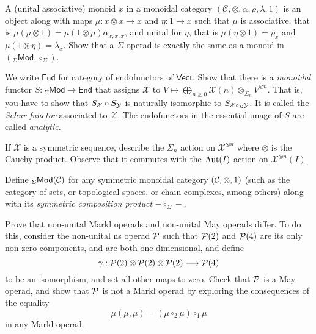 \begin{question}
A (unital associative) monoid $x$ in a monoidal category 
$(\mathcal C,\otimes,\alpha,\rho,\lambda,1)$ is an object
along with maps $\mu: x\otimes x\to x$ and $\eta : 1
 \longrightarrow x$ such that $\mu$ is associative, 
 that is $\mu (\mu\otimes 1) = \mu(1\otimes \mu)
 \alpha_{x,x,x}$, and unital for
$\eta$, that is $\mu(\eta\otimes 1)=\rho_x$
and $\mu(1\otimes \eta) = \lambda_x$.
Show that a $\Sigma$-operad is exactly the
same as a monoid in $({}_\Sigma\mathsf{Mod},\circ_\Sigma)$.
\end{question}

\begin{question}
We write $\mathsf{End}$ for
 category of endofunctors of $\mathsf{Vect}$. Show
 that there is a \emph{monoidal}
 functor $S:{}_\Sigma\mathsf{Mod}
 \longrightarrow \mathsf{End}$ that assigns
 $\mathcal{X}$ to $V\longmapsto \bigoplus_{n\geqslant 0} \mathcal{X}(n)\otimes_{\Sigma_n} V^{\otimes n}$.
 That is, 
  you have to show that $S_{\mathcal{X}}\circ
 S_{\mathcal{Y}}$ is naturally isomorphic to $S_{\mathcal{X}\circ_\Sigma \mathcal{Y}}$.
 It is called the \emph{Schur functor} associated
 to $\mathcal{X}$. The endofunctors in the essential
 image of $S$ are called \emph{analytic}.
\end{question}

\begin{question}
	 If $\mathcal{X}$
	 is a symmetric sequence, describe the $\Sigma_n$
	 action on $\mathcal{X}^{\otimes n}$ where
	 $\otimes$ is the Cauchy product. Observe that
	 it commutes with the $\operatorname{Aut}(I)$ action on 
	 $\mathcal{X}^{\otimes n}(I)$.
\end{question}
	 
\begin{question}
Define ${}_\Sigma\mathsf{Mod}(\mathcal{C})$
for any symmetric monoidal category $(\mathcal{C},\otimes,1)$
(such as the category of sets, or topological spaces,
or chain complexes, among others) along with
its \emph{symmetric composition product}
 $-\circ_\Sigma - $.
 \end{question}
 
\begin{question} Prove that non-unital Markl operads
and non-unital May operads differ.
To do this, consider the non-unital ns operad
${\mathcal{P}}$ such that ${\mathcal{P}}(2)$ and ${\mathcal{P}}(4)$
are its only non-zero components, and are
both one dimensional, and define
\[ \gamma : {\mathcal{P}}(2)\otimes {\mathcal{P}}(2)\otimes {\mathcal{P}}(2)
 	\longrightarrow {\mathcal{P}}(4) \]
to be an isomorphism, and set all other maps to zero. 
Check that ${\mathcal{P}}$ is a May operad, and
show that ${\mathcal{P}}$ is not a Markl
operad by exploring the consequences
of the equality
\[ \mu(\mu,\mu) = (\mu \circ_2\mu)\circ_1 \mu \]
in any Markl operad.
\end{question}

